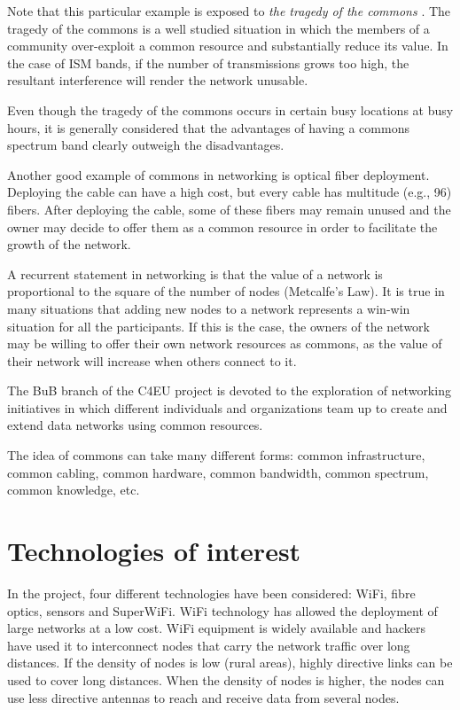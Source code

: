 \documentclass[conference]{IEEEtran}
\begin{document}
Note that this particular example is exposed to \emph{the tragedy of the commons} \cite{hardin1968tc,feeny1990tct}.
The tragedy of the commons is a well studied situation in which the members of a community over-exploit a common resource and substantially reduce its value.
In the case of ISM bands, if the number of transmissions grows too high, the resultant interference will render the network unusable.

Even though the tragedy of the commons occurs in certain busy locations at busy hours, it is generally considered that the advantages of having a commons spectrum band clearly outweigh the disadvantages.

Another good example of commons in networking is optical fiber deployment.
Deploying the cable can have a high cost, but every cable has multitude (e.g., 96) fibers.
After deploying the cable, some of these fibers may remain unused and the owner may decide to offer them as a common resource in order to facilitate the growth of the network.

A recurrent statement in networking is that the value of a network is proportional to the square of the number of nodes (Metcalfe's Law).
It is true in many situations that adding new nodes to a network represents a win-win situation for all the participants.
If this is the case, the owners of the network may be willing to offer their own network resources as commons, as the value of their network will increase when others connect to it.

The BuB branch of the C4EU project is devoted to the exploration of networking initiatives in which different individuals and organizations team up to create and extend data networks using common resources.

The idea of commons can take many different forms: common infrastructure, common cabling, common hardware, common bandwidth, common spectrum, common knowledge, etc.

\section{Technologies of interest}
\label{sec:technologies}

In the project, four different technologies have been considered: WiFi, fibre optics, sensors and SuperWiFi.
WiFi technology has allowed the deployment of large networks at a low cost.
WiFi equipment is widely available and hackers have used it to interconnect nodes that carry the network traffic over long distances.
If the density of nodes is low (rural areas), highly directive links can be used to cover long distances.
When the density of nodes is higher, the nodes can use less directive antennas to reach and receive data from several nodes.
\end{document}
